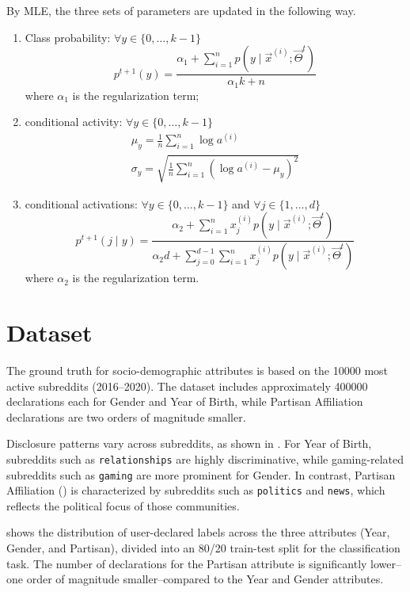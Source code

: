  By MLE, the three sets of parameters are updated in the following way.
\begin{enumerate}
    \item Class probability: $\forall y \in \{0, \ldots , k-1 \}$ 
    \[p^{t+1}(y)=\frac{\alpha_1+\sum_{i=1}^n p(y \mid \vec{x}^{(i)};\vec{\Theta}^{t})}{\alpha_1 k+ n}\]
    where $\alpha_1$ is the regularization term;
    \item conditional activity: $\forall y \in \{0, \ldots , k-1 \}$
    \begin{align*}
         \mu_y=\frac{1}{n}\sum_{i=1}^{n}\log{a^{(i)}} \\
         \sigma_y=\sqrt{\frac{1}{n}\sum_{i=1}^{n} \left( \log{a^{(i)}}- \mu_y \right)^2} 
    \end{align*}
    \item conditional activations: $\forall y \in \{0, \ldots , k-1 \} $ and $\forall j \in \{1, \ldots , d \} $
    \[p^{t+1}(j \mid y)=\frac{\alpha_2+\sum_{i=1}^n x_j^{(i)}p(y \mid \vec{x}^{(i)};\vec{\Theta}^{t})}{\alpha_2 d+ \sum_{j=0}^{d-1} \sum_{i=1}^n x_j^{(i)} p(y \mid \vec{x}^{(i)};\vec{\Theta}^{t})}\]
     where $\alpha_2$ is the regularization term.
\end{enumerate}



\section{Dataset}
The ground truth for socio-demographic attributes is based on the \num{10000} most active subreddits (2016--2020).
The dataset includes approximately \num{400000} declarations each for Gender and Year of Birth, while Partisan Affiliation declarations are two orders of magnitude smaller.

Disclosure patterns vary across subreddits, as shown in .
For Year of Birth, subreddits such as \texttt{relationships} are highly discriminative, while gaming-related subreddits such as \texttt{gaming} are more prominent for Gender.
In contrast, Partisan Affiliation () is characterized by subreddits such as \texttt{politics} and \texttt{news}, which reflects the political focus of those communities.

 shows the distribution of user-declared labels across the three attributes (Year, Gender, and Partisan), divided into an 80/20 train-test split for the classification task. 
The number of declarations for the Partisan attribute is significantly lower--one order of magnitude smaller--compared to the Year and Gender attributes.


